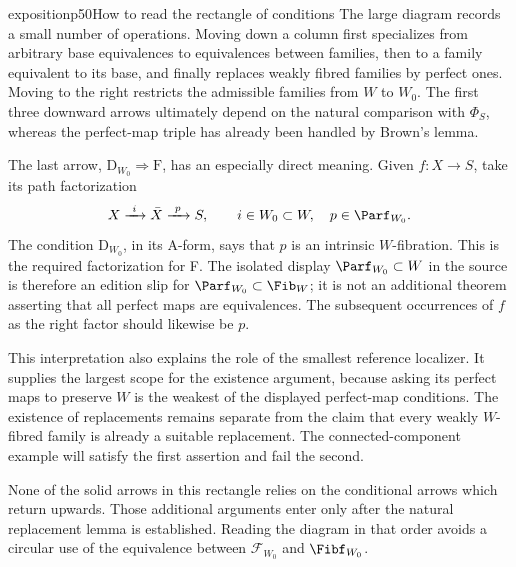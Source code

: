 \begin{dcomment}{exposition}{p50}{How to read the rectangle of conditions}
The large diagram records a small number of operations. Moving down a column first specializes from arbitrary base equivalences to equivalences between families, then to a family equivalent to its base, and finally replaces weakly fibred families by perfect ones. Moving to the right restricts the admissible families from $W$ to $W_0$. The first three downward arrows ultimately depend on the natural comparison with $\Phi_S$, whereas the perfect-map triple has already been handled by Brown's lemma.

The last arrow, $\mathrm D_{W_0}\Rightarrow\mathrm F$, has an especially direct meaning. Given $f:X\to S$, take its path factorization
\[
 X\xrightarrow{\ i\ }\bar X\xrightarrow{\ p\ }S,
 \qquad i\in W_0\subset W,\quad p\in\Parf_{W_0}.
\]
The condition $\mathrm D_{W_0}$, in its A-form, says that $p$ is an intrinsic $W$-fibration. This is the required factorization for F. The isolated display $\Parf_{W_0}\subset W$ in the source is therefore an edition slip for $\Parf_{W_0}\subset\Fib_W$; it is not an additional theorem asserting that all perfect maps are equivalences. The subsequent occurrences of $f$ as the right factor should likewise be $p$.

This interpretation also explains the role of the smallest reference localizer. It supplies the largest scope for the existence argument, because asking its perfect maps to preserve $W$ is the weakest of the displayed perfect-map conditions. The existence of replacements remains separate from the claim that every weakly $W$-fibred family is already a suitable replacement. The connected-component example will satisfy the first assertion and fail the second.

None of the solid arrows in this rectangle relies on the conditional arrows which return upwards. Those additional arguments enter only after the natural replacement lemma is established. Reading the diagram in that order avoids a circular use of the equivalence between $\mathcal F_{W_0}$ and $\Fibf_{W_0}$.
\end{dcomment}

